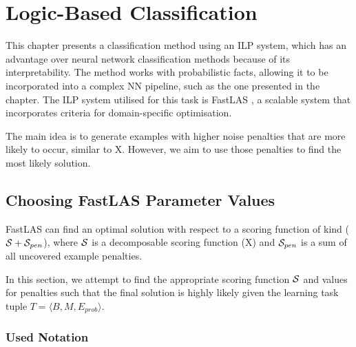 \chapter{Logic-Based Classification}
\label{logic-based-classification}


This chapter presents a  classification method using an ILP system, which has an advantage over neural network classification methods because of its interpretability.
The method works with probabilistic facts, allowing it to be incorporated into a complex NN pipeline, such as the one presented in the chapter.
The ILP system utilised for this task is FastLAS \cite{RefWorks:RefID:19-law2020fastlas:}, a scalable system that incorporates criteria for domain-specific optimisation.

The main idea is to generate examples with higher noise penalties that are more likely to occur, similar to X.
However, we aim to use those penalties to find the most likely solution.


\section{Choosing FastLAS Parameter Values}
\label{choosing-fastlas-parameter-values}

FastLAS can find an optimal solution with respect to a scoring function of kind ($\mathcal{S} + \mathcal{S}_{pen}$), where $\mathcal{S}$ is a decomposable scoring function (X) and $\mathcal{S}_{pen}$ is a sum of all uncovered example penalties.

In this section, we attempt to find the appropriate scoring function $\mathcal{S}$ and values for penalties such that the final solution is highly likely given the learning task tuple $T = \langle B, M, E_{prob} \rangle$. 

\subsection{Used Notation}

